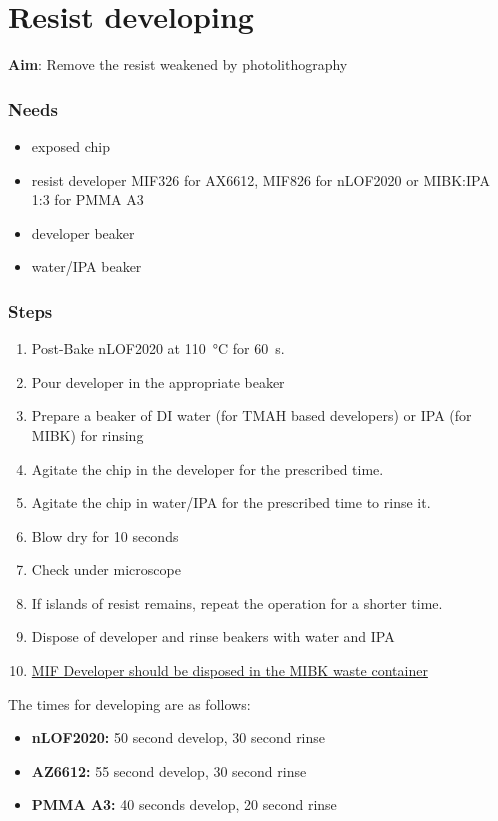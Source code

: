 \section{Resist developing}

\textbf{Aim}:
Remove the resist weakened by photolithography

\subsubsection{Needs}
\begin{itemize}[noitemsep]
\item exposed chip
\item resist developer MIF326 for AX6612, MIF826 for nLOF2020 or MIBK:IPA 1:3 for PMMA A3
\item developer beaker
\item water/IPA beaker
\end{itemize}

\subsubsection{Steps}
\begin{enumerate}
\item Post-Bake nLOF2020 at \SI{110}{\celsius} for \SI{60}{\second}.
\item Pour developer in the appropriate beaker
\item Prepare a beaker of DI water (for TMAH based developers) or IPA (for MIBK) for rinsing
\item Agitate the chip in the developer for the prescribed time.
\item Agitate the chip in water/IPA for the prescribed time to rinse it.
\item Blow dry for 10 seconds
\item Check under microscope
\item If islands of resist remains, repeat the operation for a shorter time.
\item Dispose of developer and rinse beakers with water and IPA
\item \underline{MIF Developer should be disposed in the MIBK waste container}
\end{enumerate}

The times for developing are as follows:
\begin{itemize}
  \item \textbf{nLOF2020: } 50 second develop, 30 second rinse
  \item \textbf{AZ6612: } 55 second develop, 30 second rinse
  \item \textbf{PMMA A3: } 40 seconds develop, 20 second rinse
\end{itemize}

